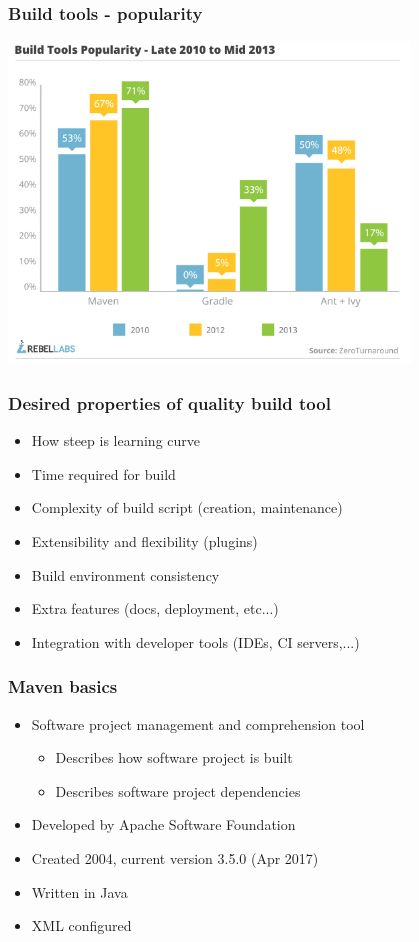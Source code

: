 \begin{frame}
\frametitle{Build tools - popularity}
	\begin{center}
		\includegraphics[width=0.8\textwidth,height=0.64\textwidth]{build-tools-popularity.png}
	\end{center}
\end{frame}

\begin{frame}
\frametitle{Desired properties of quality build tool}
\begin{itemize}
	\item How steep is learning curve
	\item Time required for build
	\item Complexity of build script (creation, maintenance)
	\item Extensibility and flexibility (plugins)
	\item Build environment consistency
	\item Extra features (docs, deployment, etc...)
	\item Integration with developer tools (IDEs, CI servers,...)
\end{itemize}
\end{frame}

\begin{frame}
\frametitle{Maven basics}
\begin{itemize}
	\item Software project management and comprehension tool %
		\begin{itemize}
		\item Describes how software project is built
		\item Describes software project dependencies
		\end{itemize}
	\item Developed by Apache Software Foundation
	\item Created 2004, current version 3.5.0 (Apr 2017)
	\item Written in Java
	\item XML configured
\end{itemize}
\end{frame}

